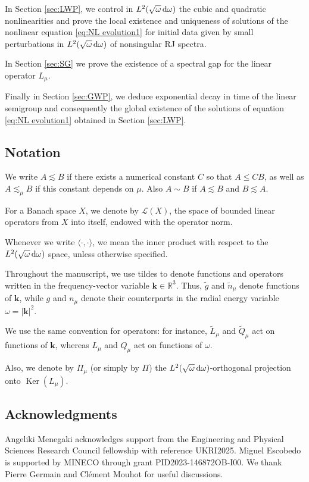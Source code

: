 \documentclass[reqno,11pt,letterpaper]{amsart}
\numberwithin{equation}{section}
\newcommand{\dd}{\, {\rm d}}
\begin{document}
 In Section \ref{sec:LWP}, we control in $L^2(\sqrt \omega \dd\omega )$ the cubic and quadratic nonlinearities and  prove the local existence and uniqueness of solutions of the nonlinear equation \eqref{eq:NL evolution1} for initial data given by small perturbations 
 in $L^2(\sqrt \omega \dd\omega )$ of nonsingular RJ spectra. 
 
 In Section \ref{sec:SG} we prove the existence of a spectral gap for the linear operator $L_\mu$. 
 
 Finally in Section \ref{sec:GWP}, we deduce exponential decay in time of the linear semigroup and consequently the global existence of the solutions of equation \eqref{eq:NL evolution1} obtained in Section \ref{sec:LWP}.

 \subsection{Notation}
 We write $A \lesssim B$ if there exists a numerical constant $C$ so that $A\leq CB$, as well as $A\lesssim_\mu B$ if this constant depends on $\mu$. Also $A\sim B$ if $A\lesssim B$ and $B\lesssim A$.
 
 For a Banach space $X$, we denote by $\mathscr L(X)$, the space of bounded linear operators from $X$ into itself, endowed with the operator norm.

 Whenever we write $\langle \cdot, \cdot \rangle$, we mean the inner product with respect to the $L^2(\sqrt{\omega} \dd \omega)$ space, unless otherwise specified. 
 
Throughout the manuscript, we use tildes to denote functions and operators written in the frequency-vector variable $\textbf{k} \in \mathbb{R}^3$. Thus, $\widetilde g$ and $\widetilde n_\mu$ denote functions of $\textbf{k}$, while $g$ and $n_\mu$ denote their counterparts in the radial energy variable $\omega=|\textbf{k}|^2$. 

We use the same convention for operators: for instance, $\widetilde L_\mu$ and $\widetilde Q_\mu$ act on functions of $\textbf{k}$, whereas $L_\mu$ and $Q_\mu$ act on functions of $\omega$.

Also, we denote by $\Pi_\mu$ (or simply by $\Pi$) the $L^2(\sqrt{\omega}\dd \omega)$-orthogonal projection onto $\operatorname{Ker}(L_\mu)$.

\subsection{Acknowledgments} Angeliki Menegaki acknowledges support from the Engineering and Physical Sciences Research Council fellowship with reference UKRI2025. Miguel Escobedo is supported by MINECO through grant PID2023-146872OB-I00.
We thank Pierre Germain and Clément Mouhot for useful discussions.  
\end{document}
